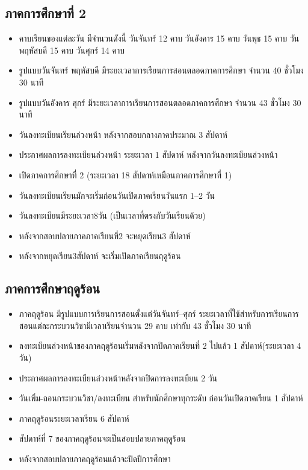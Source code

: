   

\subsection{ภาคการศึกษาที่ 2}
\begin{itemize}
  \item คาบเรียนของแต่ละวัน มีจำนวนดังนี้ วันจันทร์ 12 คาบ วันอังคาร 15 คาบ วันพุธ 15 คาบ วันพฤหัสบดี 15 คาบ วันศุกร์ 14 คาบ
  \item รูปแบบวันจันทร์ พฤหัสบดี มีระยะเวลาการเรียนการสอนตลอดภาคการศึกษา จำนวน 40 ชั่วโมง 30 นาที
  \item รูปแบบวันอังคาร ศุกร์ มีระยะเวลาการเรียนการสอนตลอดภาคการศึกษา จำนวน 43 ชั่วโมง 30 นาที
  \item วันลงทะเบียนเรียนล่วงหน้า หลังจากสอบกลางภาคประมาณ 3 สัปดาห์
  \item ประกาศผลการลงทะเบียนล่วงหน้า ระยะเวลา 1 สัปดาห์ หลังจากวันลงทะเบียนล่วงหน้า 
  \item เปิดภาคการศึกษาที่ 2 (ระยะเวลา 18 สัปดาห์เหมือนภาคการศึกษาที่ 1)
  \item วันลงทะเบียนเรียนมักจะเริ่มก่อนวันเปิดภาคเรียนวันแรก 1--2 วัน
  \item วันลงทะเบียนมีระยะเวลา8วัน (เป็นเวลาที่ตรงกับวันเรียนด้วย)
  \item หลังจากสอบปลายภาคภาคเรียนที่2 จะหยุดเรียน3 สัปดาห์
  \item หลังจากหยุดเรียน3สัปดาห์ จะเริ่มเปิดภาคเรียนฤดูร้อน
\end{itemize}

\subsection{ภาคการศึกษาฤดูร้อน}
\begin{itemize}
  \item ภาคฤดูร้อน มีรูปแบบการเรียนการสอนตั้งแต่วันจันทร์--ศุกร์ ระยะเวลาที่ใช้สำหรับการเรียนการสอนแต่ละกระบวนวิชามีเวลาเรียนจำนวน 29 คาบ เท่ากับ 43 ชั่วโมง 30 นาที
  \item ลงทะเบียนล่วงหน้าของภาคฤดูร้อนเริ่มหลังจากปิดภาคเรียนที่ 2 ไปแล้ว 1 สัปดาห์(ระยะเวลา 4 วัน)
  \item ประกาศผลการลงทะเบียนล่วงหน้าหลังจากปิดการลงทะเบียน 2 วัน
  \item วันเพิ่ม-ถอนกระบวนวิชา/ลงทะเบียน สำหรับนักศึกษาทุกระดับ ก่อนวันเปิดภาคเรียน 1 สัปดาห์
  \item ภาคฤดูร้อนระยะเวลาเรียน 6 สัปดาห์
  \item สัปดาห์ที่ 7 ของภาคฤดูร้อนจะเป็นสอบปลายภาคฤดูร้อน
  \item หลังจากสอบปลายภาคฤดูร้อนแล้วจะปิดปีการศึกษา
\end{itemize}


